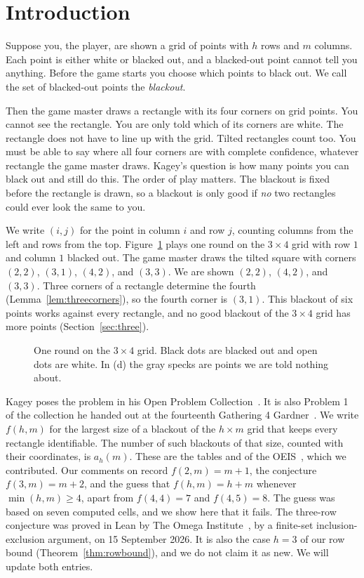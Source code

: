 \section{Introduction}\label{sec:intro}

Suppose you, the player, are shown a grid of points with $h$ rows and $m$ columns. Each
point is either white or blacked out, and a blacked-out point cannot tell you anything.
Before the game starts you choose which points to black out. We call the set of
blacked-out points the \emph{blackout}.

Then the game master draws a rectangle with its four corners on grid points. You cannot
see the rectangle. You are only told which of its corners are white. The rectangle does
not have to line up with the grid. Tilted rectangles count too. You must be able to say
where all four corners are with complete confidence, whatever rectangle the game master
draws. Kagey's question is how many points you can black out and still do this. The order
of play matters. The blackout is fixed before the rectangle is drawn, so a blackout is
only good if \emph{no} two rectangles could ever look the same to you.

We write $(i,j)$ for the point in column $i$ and row $j$, counting columns from the left
and rows from the top. Figure~\ref{fig:game} plays one round on the $3\times4$ grid with
row $1$ and column $1$ blacked out. The game master draws the tilted square with corners
$(2,2)$, $(3,1)$, $(4,2)$, and $(3,3)$. We are shown $(2,2)$, $(4,2)$, and $(3,3)$.
Three corners of a rectangle determine the fourth (Lemma~\ref{lem:threecorners}), so the
fourth corner is $(3,1)$. This blackout of six points works against every rectangle, and
no good blackout of the $3\times4$ grid has more points (Section~\ref{sec:three}).

\begin{figure}[t]
\centering
\resizebox{0.7\textwidth}{!}{}
\caption{One round on the $3\times4$ grid. Black dots are blacked out and open dots are
white. In (d) the gray specks are points we are told nothing about.}
\label{fig:game}
\end{figure}

Kagey poses the problem in his Open Problem Collection~\cite{kagey001}. It is also
Problem 1 of the collection he handed out at the fourteenth Gathering 4
Gardner~\cite{kageyG4G14}. We write $f(h,m)$ for the largest size of a blackout of the
$h\times m$ grid that keeps every rectangle identifiable. The number of such blackouts of
that size, counted with their coordinates, is $a_h(m)$. These are the tables
 and  of the OEIS~\cite{oeis}, which we contributed. Our
comments on  record $f(2,m)=m+1$, the conjecture $f(3,m)=m+2$, and the
guess that $f(h,m)=h+m$ whenever $\min(h,m)\ge4$, apart from $f(4,4)=7$ and $f(4,5)=8$.
The guess was based on seven computed cells, and we show here that it fails. The
three-row conjecture was proved in Lean by The Omega Institute~\cite{trureturing2026}, by
a finite-set inclusion-exclusion argument, on 15 September 2026. It is also the case
$h=3$ of our row bound (Theorem~\ref{thm:rowbound}), and we do not claim it as new. We
will update both entries.

